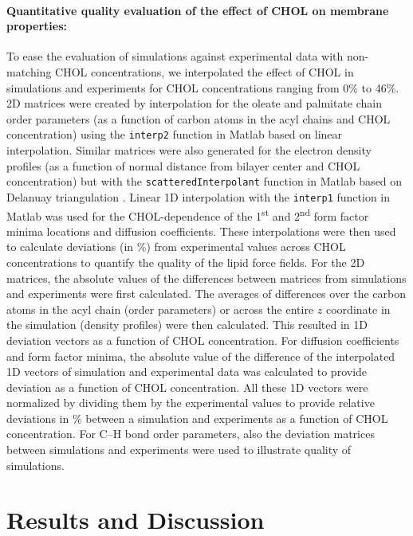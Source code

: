 \documentclass[journal=jctcce]{achemso}
\begin{document}
\paragraph{Quantitative quality evaluation of the effect of CHOL on membrane properties:} To ease the evaluation of simulations against experimental data with non-matching CHOL concentrations, we interpolated the effect of CHOL in simulations and experiments for CHOL concentrations ranging from 0\% to 46\%. 2D matrices were created by interpolation for the oleate and palmitate chain order parameters (as a function of carbon atoms in the acyl chains and CHOL concentration) using the \texttt{interp2} function in Matlab based on linear interpolation. Similar matrices were also generated for the electron density profiles (as a function of normal distance from bilayer center and CHOL concentration) but with the \texttt{scatteredInterpolant} function in Matlab based on Delanuay triangulation \cite{amidror2002scattered}. Linear 1D interpolation with the \texttt{interp1} function in Matlab was used for the CHOL-dependence of the 1\textsuperscript{st} and 2\textsuperscript{nd} form factor minima locations and diffusion coefficients. These interpolations were then used to calculate deviations (in \%) from experimental values across CHOL concentrations to quantify the quality of the lipid force fields.  For the 2D matrices, the absolute values of the differences between matrices from simulations and experiments were first calculated. The averages of differences over the carbon atoms in the acyl chain (order parameters) or across the entire $z$ coordinate in the simulation (density profiles) were then calculated. This resulted in 1D deviation vectors as a function of CHOL concentration. For diffusion coefficients and form factor minima, the absolute value of the difference of the interpolated 1D vectors of simulation and experimental data was calculated to provide deviation as a function of CHOL concentration. All these 1D vectors were normalized by dividing them by the experimental values to provide relative deviations in \% between a simulation and experiments as a function of CHOL concentration. For C--H bond order parameters, also the deviation matrices between simulations and experiments were used to illustrate quality of simulations.


\section{Results and Discussion}
\end{document}
